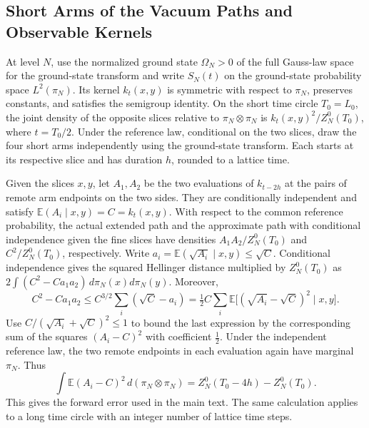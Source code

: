 \documentclass[11pt,a4paper]{article}
\numberwithin{equation}{section}
\begin{document}
\subsection{Short Arms of the Vacuum Paths and Observable Kernels}
\label{app:cam-bridge}

At level \(N\), use the normalized ground state \(\Omega_N>0\) of the full Gauss-law space for the ground-state transform and write \(S_N(t)\) on the ground-state probability space \(L^2(\pi_N)\). Its kernel \(k_t(x,y)\) is symmetric with respect to \(\pi_N\), preserves constants, and satisfies the semigroup identity. On the short time circle \(T_0=L_0\), the joint density of the opposite slices relative to \(\pi_N\otimes\pi_N\) is \(k_t(x,y)^2/Z_N^0(T_0)\), where \(t=T_0/2\). Under the reference law, conditional on the two slices, draw the four short arms independently using the ground-state transform. Each starts at its respective slice and has duration \(h\), rounded to a lattice time.

Given the slices \(x,y\), let \(A_1,A_2\) be the two evaluations of \(k_{t-2h}\) at the pairs of remote arm endpoints on the two sides. They are conditionally independent and satisfy \(\mathbb E(A_i\mid x,y)=C=k_t(x,y)\). With respect to the common reference probability, the actual extended path and the approximate path with conditional independence given the fine slices have densities \(A_1A_2/Z_N^0(T_0)\) and \(C^2/Z_N^0(T_0)\), respectively. Write \(a_i=\mathbb E(\sqrt{A_i}\mid x,y)\leq\sqrt C\). Conditional independence gives the squared Hellinger distance multiplied by \(Z_N^0(T_0)\) as \(2\int(C^2-Ca_1a_2)\,d\pi_N(x)d\pi_N(y)\). Moreover,
\[
 C^2-Ca_1a_2\leq C^{3/2}\sum_i(\sqrt C-a_i)
       =\tfrac12 C\sum_i\mathbb E\big[(\sqrt{A_i}-\sqrt C)^2\mid x,y\big].
\]
Use \(C/(\sqrt{A_i}+\sqrt C)^2\leq1\) to bound the last expression by the corresponding sum of the squares \((A_i-C)^2\) with coefficient \(\tfrac12\). Under the independent reference law, the two remote endpoints in each evaluation again have marginal \(\pi_N\). Thus
\[
 \int\mathbb E(A_i-C)^2\,d(\pi_N\otimes\pi_N)
       = Z_N^0(T_0-4h)-Z_N^0(T_0).
\]
This gives the forward error used in the main text. The same calculation applies to a long time circle with an integer number of lattice time steps.
\end{document}

